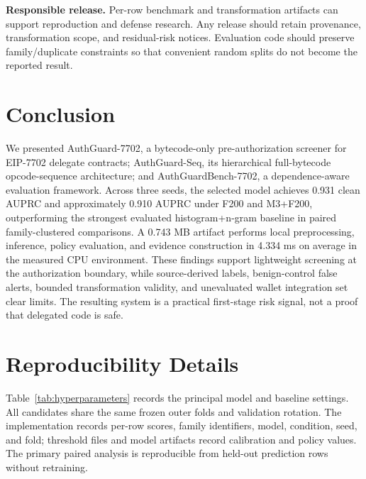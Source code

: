 \documentclass[conference]{IEEEtran}
\newcommand{\system}{AuthGuard-7702}
\newcommand{\model}{AuthGuard-Seq}
\newcommand{\bench}{AuthGuardBench-7702}
\begin{document}
\textbf{Responsible release.} Per-row benchmark and transformation artifacts can support
reproduction and defense research. Any release should retain provenance, transformation scope,
and residual-risk notices. Evaluation code should preserve family/duplicate constraints so that
convenient random splits do not become the reported result.

\section{Conclusion}
\label{sec:conclusion}

We presented \system, a bytecode-only pre-authorization screener for EIP-7702 delegate contracts;
\model, its hierarchical full-bytecode opcode-sequence architecture; and \bench, a
dependence-aware evaluation framework. Across three seeds, the selected model achieves 0.931
clean AUPRC and approximately 0.910 AUPRC under F200 and M3+F200, outperforming the strongest
evaluated histogram+n-gram baseline in paired family-clustered comparisons. A 0.743 MB artifact
performs local preprocessing, inference, policy evaluation, and evidence construction in 4.334
ms on average in the measured CPU environment. These findings support lightweight screening at
the authorization boundary, while source-derived labels, benign-control false alerts, bounded
transformation validity, and unevaluated wallet integration set clear limits. The resulting
system is a practical first-stage risk signal, not a proof that delegated code is safe.

\appendices

\section{Reproducibility Details}
\label{app:reproducibility}

Table~\ref{tab:hyperparameters} records the principal model and baseline settings. All candidates
share the same frozen outer folds and validation rotation. The implementation records per-row
scores, family identifiers, model, condition, seed, and fold; threshold files and model artifacts
record calibration and policy values. The primary paired analysis is reproducible from held-out
prediction rows without retraining.
\end{document}
